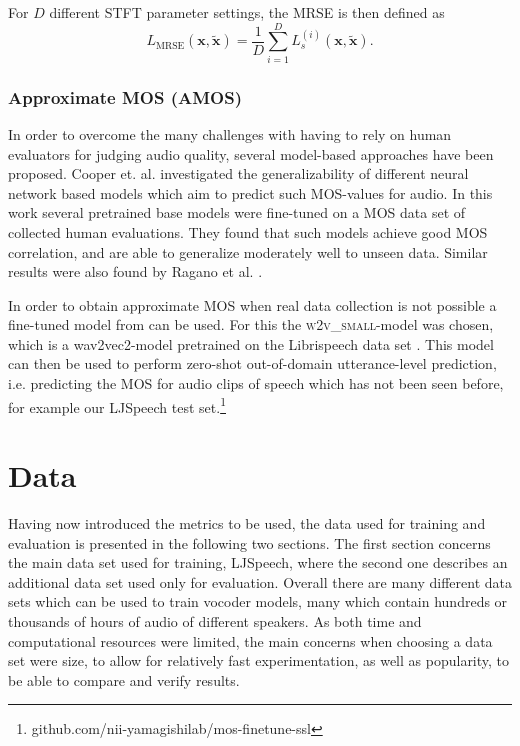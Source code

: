 \documentclass{report}
\begin{document}
For $D$ different STFT parameter settings, the MRSE is then defined as 
\begin{equation}
    L_{\text{MRSE}}(\bm{x}, \tilde{\bm{x}}) = \frac{1}{D} \sum_{i=1}^D L_{s}^{(i)}(\bm{x}, \tilde{\bm{x}}).
\end{equation}


\subsection{Approximate MOS (AMOS)} \label{sec:amos}

In order to overcome the many challenges with having to rely on human evaluators for judging audio quality, several model-based approaches have been proposed. Cooper et. al. \cite{cooper2022generalization} investigated the generalizability of different neural network based models which aim to predict such MOS-values for audio. In this work several pretrained base models were fine-tuned on a MOS data set of collected human evaluations. They found that such models achieve good MOS correlation, and are able to generalize moderately well to unseen data. Similar results were also found by Ragano et al. \cite{ragano2022comparison}.

In order to obtain approximate MOS when real data collection is not possible a fine-tuned model from \cite{cooper2022generalization} can be used. For this the \textsc{w2v\_small}-model was chosen, which is a wav2vec2-model \cite{baevski2020wav2vec} pretrained on the Librispeech data set \cite{panayotov2015librispeech}. This model can then be used to perform zero-shot out-of-domain utterance-level prediction, i.e. predicting the MOS for audio clips of speech which has not been seen before, for example our LJSpeech test set.\footnote{github.com/nii-yamagishilab/mos-finetune-ssl}


\newpage
\chapter{Data}
Having now introduced the metrics to be used, the data used for training and evaluation is presented in the following two sections. The first section concerns the main data set used for training, LJSpeech, where the second one describes an additional data set used only for evaluation. Overall there are many different data sets which can be used to train vocoder models, many which contain hundreds or thousands of hours of audio of different speakers. As both time and computational resources were limited, the main concerns when choosing a data set were size, to allow for relatively fast experimentation, as well as popularity, to be able to compare and verify results.
\end{document}
